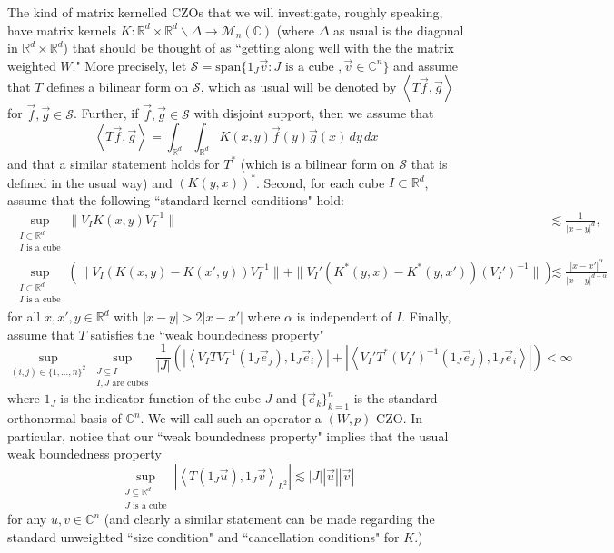 \documentclass[12pt,reqno ]{amsart}
\numberwithin{equation}{section}
\theoremstyle{definition}
\newcommand{\abs}[1]{|#1|}
\newcommand{\C}{\ensuremath{\mathbb{C}^n}}
\newcommand{\R}{\ensuremath{\mathbb{R}}}
\newcommand{\Rd}{\ensuremath{\mathbb{R}^d}}
\newcommand{\Mn}{\ensuremath{\mathcal{M}_{n }}(\mathbb{C})}
\newcommand{\Span}{\text{span}}
\newcommand{\V}[1]{\ensuremath{\vec{#1}}}
\newcommand{\inrd}{\ensuremath{\int_{\Rd}}}
\newcommand{\ip}[2]{\ensuremath{\left\langle#1,#2\right\rangle}}
\newcommand{\MC}[1]{\ensuremath{\mathcal{#1}}}
\begin{document}
The kind of matrix kernelled CZOs that we will investigate, roughly speaking, have matrix kernels $K : \Rd \times \Rd \backslash \Delta \rightarrow \Mn$ (where $\Delta$ as usual is the diagonal in $\Rd \times \Rd$)  that should be thought of as ``getting along well with the the matrix weighted $W$."  More precisely, let $\MC{S} = \Span\{1_J \vec{v} : J \text{ is a cube }, \V{v} \in \C\}$ and assume that $T $ defines a bilinear form on $\MC{S}$, which as usual will be denoted by $\ip{T\V{f}}{\V{g}}$ for $\V{f}, \V{g} \in \MC{S}$.    Further, if $\V{f}, \V{g} \in \MC{S}$ with disjoint support, then we assume that
\begin{equation*} \ip{T\V{f}}{\V{g}} = \inrd \inrd  K(x, y) \vec{f} (y) \vec{g} (x)\, dy \, dx  \end{equation*} and that a similar statement holds for $T^*$  (which is a bilinear form on $\MC{S}$ that is defined in the usual way) and $(K(y, x))^*$.    Second, for each cube $I \subset \Rd$, assume that the following ``standard kernel conditions" hold: \begin{equation*}
\begin{split}
 \sup_{\substack{I \subset \R^d \\  I \text{ is a cube}}} \|V_I K(x,y) V_I ^{-1}\| &\lesssim\frac{1}{\abs{x-y}^d}, \\
  \sup_{\substack{I \subset \R^d \\  I \text{ is a cube}}} \left(\|V_I (K(x,y)-K(x',y)) V_I ^{-1}\| + \|V_I ' (K^*(y,x)-K^*(y,x'))(V_I ') ^{-1}\| \right)
  &\lesssim  \frac{\abs{x-x'}^\alpha}{\abs{x-y}^{d + \alpha}}
\end{split}
\end{equation*}
for all $x,x',y\in\R^d$ with $\abs{x-y}>2\abs{x-x'}$ where $\alpha$ is independent of $I$. Finally, assume that $T$ satisfies the ``weak boundedness property" \begin{equation*} \sup_{(i, j) \in \{1, \ldots, n\}^2}\sup_{\substack{J  \subseteq I \\  I, J \text{ are cubes}}}   \frac{1}{|J|}  \left(|\ip{ V_I T V_I ^{-1} (1_J \V{e}_j)}{ 1_J \V{e}_i}| + |\ip{ V_I ' T^* (V_I') ^{-1} (1_J \V{e}_j)}{ 1_J \V{e}_i}| \right)< \infty  \end{equation*} where $1_J$ is the indicator function of the cube $J$ and $\{\vec{e}_k\}_{k = 1}^n$ is the standard orthonormal basis of $\C$.  We will call such an operator a $(W, p)$-CZO. In particular, notice that our ``weak boundedness property" implies that the usual weak boundedness property \begin{equation*} \sup_{\substack{J \subseteq \R^d \\  J \text{ is a cube}}} |\ip{T (1_J \V{u})}{1_J \V{v}}_{L^2}| \lesssim |J| |\V{u}| | \V{v}| \end{equation*} for any $u, v \in \C$ (and clearly a similar statement can be made regarding the standard unweighted ``size condition" and ``cancellation conditions" for $K$.)
\end{document}

